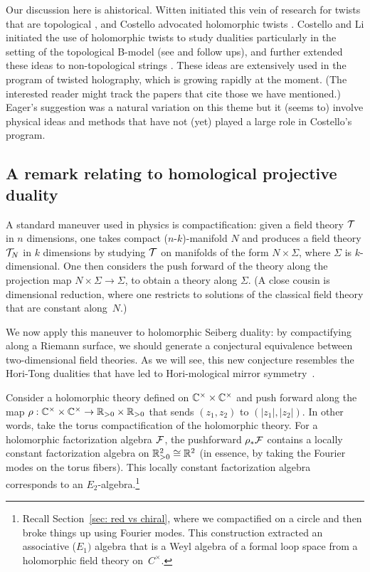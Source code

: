 \documentclass[11pt]{amsart}
\begin{document}
\begin{rmk}
Our discussion here is ahistorical.
Witten initiated this vein of research for twists that are topological \cite{WittenTwist},
and Costello advocated holomorphic twists \cite{CosSUSY}.  
Costello and Li initiated the use of holomorphic twists to study dualities particularly in the setting of the topological B-model (see \cite{CLbcov} and follow ups), and further extended these ideas to non-topological strings \cite{CLsugra}. 
These ideas are extensively used in the program of twisted holography, which is growing rapidly at the moment.
(The interested reader might track the papers that cite those we have mentioned.)
Eager's suggestion was a natural variation on this theme but it (seems to) involve physical ideas and methods that have not (yet) played a large role in Costello's program.
\end{rmk}

\subsection{A remark relating to homological projective duality}

A standard maneuver used in physics is compactification:
given a field theory $\mathcal T$ in $n$ dimensions, one takes compact ($n$-$k$)-manifold $N$ and produces a field theory $\mathcal T_N$ in $k$ dimensions by studying $\mathcal T$ on manifolds of the form $N \times \Sigma$, where $\Sigma$ is $k$-dimensional.
One then considers the push forward of the theory along the projection map $N \times \Sigma \to \Sigma$, to obtain a theory along $\Sigma$.
(A close cousin is dimensional reduction, where one restricts to solutions of the classical field theory that are constant along~$N$.)

We now apply this maneuver to holomorphic Seiberg duality:
by compactifying along a Riemann surface, we should generate a conjectural equivalence between two-dimensional field theories.
As we will see, this new conjecture resembles the Hori-Tong dualities that have led to Hori-mological mirror symmetry~\cite{Hori, HoriTong, HMSegRen}.

Consider a holomorphic theory defined on ${\mathbb{C}}^\times \times {\mathbb{C}}^\times$ 
and push forward along the map $\rho: \mathbb C^\times \times \mathbb C^\times \to \mathbb R_{>0} \times \mathbb R_{>0}$ 
that sends $(z_1,z_2)$ to $(|z_1|, |z_2|)$.
In other words, take the torus compactification of the holomorphic theory.
For a holomorphic factorization algebra $\mathcal F$, 
the pushforward $\rho_* \mathcal F$ contains a locally constant factorization algebra on $\mathbb R_{> 0}^2 \cong \mathbb R^2$ (in essence, by taking the Fourier modes on the torus fibers).
This locally constant factorization algebra corresponds to an $E_2$-algebra.\footnote{Recall Section~\ref{sec: red vs chiral}, where we compactified on a circle and then broke things up using Fourier modes. This construction extracted an associative ($E_1)$ algebra that is a Weyl algebra of a formal loop space from a holomorphic field theory on~$C^\times$.}
\end{document}
